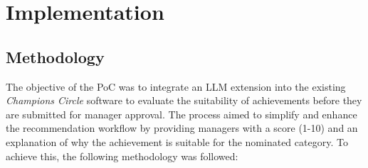 \chapter{Implementation}
\label{implementation}

\section{Methodology}
The objective of the \ac{PoC} was to integrate an \ac{LLM} extension into the existing \textit{Champions Circle} software to evaluate the suitability of achievements 
before they are submitted for manager approval. The process aimed to simplify and enhance the recommendation workflow by providing managers with a score (1-10) and an 
explanation of why the achievement is suitable for the nominated category. To achieve this, the following methodology was followed:

